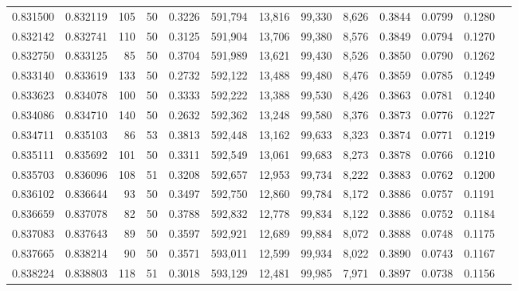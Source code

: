 \begin{tabular}{rrrrrrrrrrrrr}
0.831500 & 0.832119 &   105 &  50 &                                     0.3226 & 591,794 &  13,816 &  99,330 &   8,626 & 0.3844 & 0.0799 & 0.1280 \\
0.832142 & 0.832741 &   110 &  50 &                                     0.3125 & 591,904 &  13,706 &  99,380 &   8,576 & 0.3849 & 0.0794 & 0.1270 \\
0.832750 & 0.833125 &    85 &  50 &                                     0.3704 & 591,989 &  13,621 &  99,430 &   8,526 & 0.3850 & 0.0790 & 0.1262 \\
0.833140 & 0.833619 &   133 &  50 &                                     0.2732 & 592,122 &  13,488 &  99,480 &   8,476 & 0.3859 & 0.0785 & 0.1249 \\
0.833623 & 0.834078 &   100 &  50 &                                     0.3333 & 592,222 &  13,388 &  99,530 &   8,426 & 0.3863 & 0.0781 & 0.1240 \\
0.834086 & 0.834710 &   140 &  50 &                                     0.2632 & 592,362 &  13,248 &  99,580 &   8,376 & 0.3873 & 0.0776 & 0.1227 \\
0.834711 & 0.835103 &    86 &  53 &                                     0.3813 & 592,448 &  13,162 &  99,633 &   8,323 & 0.3874 & 0.0771 & 0.1219 \\
0.835111 & 0.835692 &   101 &  50 &                                     0.3311 & 592,549 &  13,061 &  99,683 &   8,273 & 0.3878 & 0.0766 & 0.1210 \\
0.835703 & 0.836096 &   108 &  51 &                                     0.3208 & 592,657 &  12,953 &  99,734 &   8,222 & 0.3883 & 0.0762 & 0.1200 \\
0.836102 & 0.836644 &    93 &  50 &                                     0.3497 & 592,750 &  12,860 &  99,784 &   8,172 & 0.3886 & 0.0757 & 0.1191 \\
0.836659 & 0.837078 &    82 &  50 &                                     0.3788 & 592,832 &  12,778 &  99,834 &   8,122 & 0.3886 & 0.0752 & 0.1184 \\
0.837083 & 0.837643 &    89 &  50 &                                     0.3597 & 592,921 &  12,689 &  99,884 &   8,072 & 0.3888 & 0.0748 & 0.1175 \\
0.837665 & 0.838214 &    90 &  50 &                                     0.3571 & 593,011 &  12,599 &  99,934 &   8,022 & 0.3890 & 0.0743 & 0.1167 \\
0.838224 & 0.838803 &   118 &  51 &                                     0.3018 & 593,129 &  12,481 &  99,985 &   7,971 & 0.3897 & 0.0738 & 0.1156 \\

\end{tabular}
